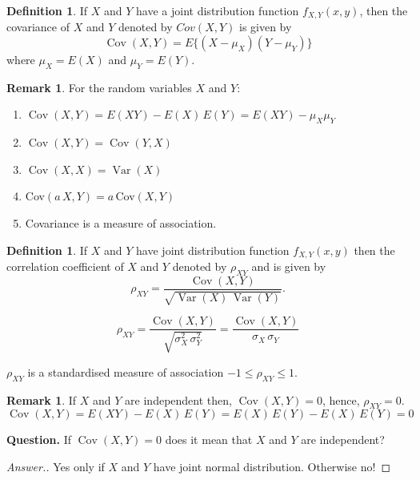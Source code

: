 \documentclass[12pt,a4paper]{report}
\theoremstyle{definition}
\newtheorem{definition}[thm]{Definition}
\newtheorem{remark}[thm]{Remark}
\theoremstyle{plain}
\theoremstyle{definition}
\begin{document}
\begin{definition}
If $X$ and $Y$ have a joint distribution function $f_{X,Y}(x,y)$, then the covariance of $X$ and $Y$ denoted by $Cov(X,Y)$ is given by \[\operatorname{Cov}(X,Y)=E\{(X-\mu_X)(Y-\mu_Y)\}\] where $\mu_X=E(X)$ and $\mu_Y=E(Y)$.
\end{definition}





\begin{remark}
For the random variables $X$ and $Y$:
\begin{enumerate}
\item $\operatorname{Cov} (X,Y)=E (XY)-E(X)\,E(Y)=E(XY)-\mu_X\mu_Y$
\item $\operatorname{Cov} (X,Y)= \operatorname{Cov}(Y,X)$
\item $\operatorname{Cov} (X,X)= \operatorname{Var}(X)$
\item Cov$(a\,X,Y) = a\,$Cov$(X,Y)$
\item Covariance is a measure of association.
\end{enumerate}
\end{remark}



\begin{definition}
If $X$ and $Y$ have joint distribution function $f_{X,Y}(x,y)$ then the correlation coefficient of $X$ and $Y$ denoted by $\rho_{XY}$ and is given by \[\rho_{XY}=\frac{\operatorname{Cov}(X,Y)}{\sqrt{\operatorname{Var}(X)\,\operatorname{Var}(Y)}}.\]

\[\rho_{XY}=\frac{\operatorname{Cov}(X,Y)}{\sqrt{\sigma_X^2\,\sigma_Y^2}}=\frac{\operatorname{Cov}(X,Y)}{\sigma_X\,\sigma_Y}\]

$\rho_{XY}$ is a standardised measure of association $-1\leq \rho_{XY}\leq 1$. 
\end{definition}


\begin{remark}
If $X$ and $Y$ are independent then, $\operatorname{Cov}(X,Y)=0$, hence, $\rho_{XY}=0$.
\[\operatorname{Cov}(X,Y) = E(XY) - E(X)\,E(Y) = E(X)\, E(Y) - E(X)\, E(Y) = 0\]
\end{remark}



\textbf{Question.} If $\operatorname{Cov}(X,Y)=0$ does it mean that $X$ and $Y$ are independent?
\begin{proof}[\textit{Answer.}]
Yes only if $X$ and $Y$ have joint normal distribution. Otherwise no!
\end{proof}
\end{document}
